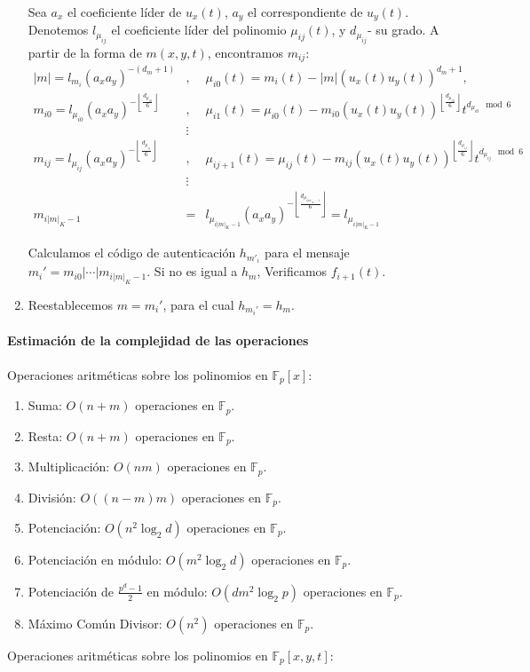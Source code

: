 \documentclass[12pt]{article}
\begin{document}
\begin{enumerate}
Sea  $a_x$ el coeficiente l\'ider de  $u_x(t)$, $a_y$ el correspondiente de $u_y(t)$. Denotemos $l_{\mu_{ij}}$ el coeficiente l\'ider del polinomio  $\mu_{ij}(t)$, y $d_{\mu_{ij}}$- su grado. A partir de la forma de $m(x,y,t)$, encontramos $m_{ij}$:
\begin{eqnarray*}
|m|=l_{m_i}(a_xa_y)^{-(d_m+1)}&,&  \mu_{i0}(t)=m_i(t)-|m|(u_x(t)u_y(t))^{d_m+1},\\
m_{i0}=l_{\mu_{i0}}(a_xa_y)^{-\left\lfloor\frac{d_{\mu_{i0}}}{6}\right\rfloor}&,&  \mu_{i1}(t)=\mu_{i0}(t)-m_{i0}(u_x(t)u_y(t))^{\left\lfloor\frac{d_{\mu_{i0}}}{6}\right\rfloor}t^{d_{\mu_{i0}} \mod 6}\\
&\vdots&\\
m_{ij}=l_{\mu_{ij}}(a_xa_y)^{-\left\lfloor\frac{d_{\mu_{ij}}}{6}\right\rfloor}&,&  \mu_{ij+1}(t)=\mu_{ij}(t)-m_{ij}(u_x(t)u_y(t))^{\left\lfloor\frac{d_{\mu_{ij}}}{6}\right\rfloor}t^{d_{\mu_{ij}} \mod 6}\\
&\vdots&\\
m_{i|m|_K-1}&=&l_{\mu_{i|m|_K-1}}(a_xa_y)^{-\left\lfloor\frac{d_{\mu_{i|m|_K-1}}}{6}\right\rfloor}=l_{\mu_{i|m|_K-1}}
\end{eqnarray*}

Calculamos el c\'odigo de autenticaci\'on $h_{m'_i}$ para el mensaje \\$m_i'=m_{i0}|\cdots|m_{i|m|_K-1}$. Si no es igual a $h_m$, Verificamos  $f_{i+1}(t)$.
\item Reestablecemos $m=m_i'$, para el cual $h_{m_i'}= h_m$. 
\end{enumerate}

\paragraph*{Estimación de la complejidad de las operaciones}
\noindent

Operaciones aritm\'eticas sobre los polinomios en  $\mathbb{F}_p[x]$:

\begin{enumerate}
\item Suma: $O(n+m)$ operaciones en $\mathbb{F}_p$.
\item Resta: $O(n+m)$ operaciones en $\mathbb{F}_p$.
\item Multiplicaci\'on: $O(nm)$ operaciones en $\mathbb{F}_p$.
\item Divisi\'on: $O((n-m)m)$ operaciones en $\mathbb{F}_p$.
\item Potenciaci\'on: $O(n^2\log_2d)$ operaciones en $\mathbb{F}_p$.
\item Potenciaci\'on en m\'odulo: $O(m^2\log_2d)$ operaciones en $\mathbb{F}_p$.
\item Potenciaci\'on de $\frac{p^d-1}{2}$ en m\'odulo: $O(dm^2\log_2p)$ operaciones en $\mathbb{F}_p$.
\item M\'aximo Com\'un Divisor: $O(n^2)$ operaciones en $\mathbb{F}_p$.
\end{enumerate}
Operaciones aritm\'eticas sobre los polinomios en $\mathbb{F}_p[x,y,t]$:
\end{document}
